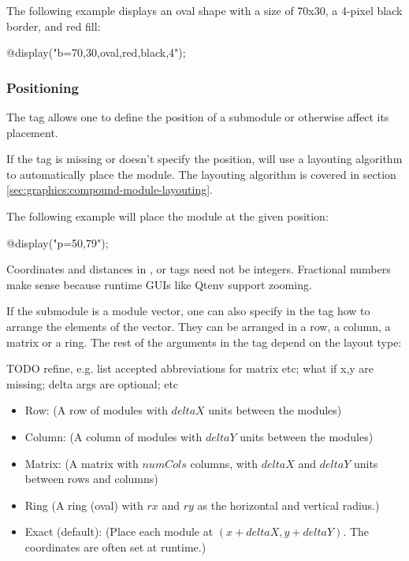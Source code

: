 The following example displays an oval shape with a size of 70x30, a 4-pixel
black border, and red fill:

\begin{ned}
@display("b=70,30,oval,red,black,4");
\end{ned}

\begin{center}
\end{center}

\subsubsection{Positioning}
\label{sec:graphics:submodule-positioning}

The  tag allows one to define the position of a submodule or otherwise affect its placement.

\begin{note}
If the  tag is missing or doesn't specify the position, {\opp} will use a
layouting algorithm to automatically place the module. The layouting algorithm
is covered in section \ref{sec:graphics:compound-module-layouting}.
\end{note}

The following example will place the module at the given position:

\begin{ned}
@display("p=50,79");
\end{ned}

\begin{note}
Coordinates and distances in ,  or  tags need not
be integers. Fractional numbers make sense because runtime GUIs like
Qtenv support zooming.
\end{note}

If the submodule is a module vector, one can also specify in the 
tag how to arrange the elements of the vector. They can be arranged in a
row, a column, a matrix or a ring. The rest of the arguments in the 
tag depend on the layout type:

TODO refine, e.g. list accepted abbreviations for matrix etc; what if x,y are missing; delta args are optional; etc

\begin{itemize}
  \item Row:  (A row of modules with $deltaX$ units between the modules)
  \item Column:  (A column of modules with $deltaY$ units between the modules)
  \item Matrix:  (A matrix with $numCols$ columns, with
            $deltaX$ and $deltaY$ units between rows and columns)
  \item Ring  (A ring (oval) with $rx$ and $ry$ as the horizontal and vertical radius.)
  \item Exact (default):  (Place each module at $(x+deltaX, y+deltaY)$.
            The coordinates are often set at runtime.)
\end{itemize}

